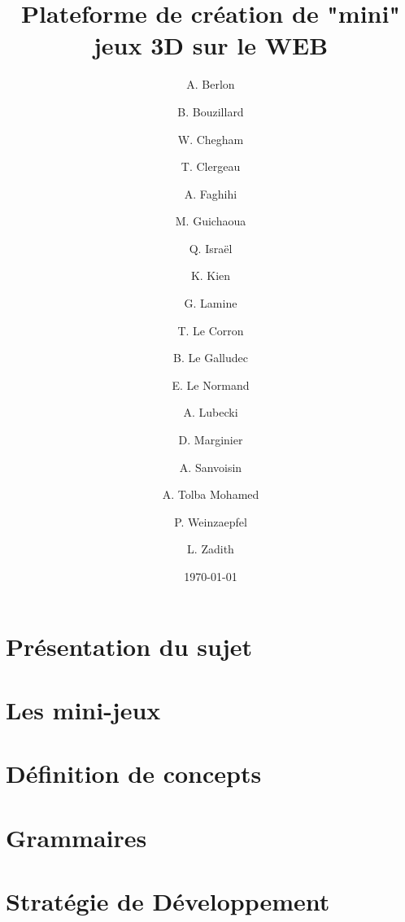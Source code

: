 \documentclass[a4paper,10pt]{article}
\title{Plateforme de création de "mini" jeux 3D sur le WEB}
\author{
A. Berlon \and
B. Bouzillard \and
W. Chegham \and
T. Clergeau \and
A. Faghihi \and
M. Guichaoua \and
Q. Israël \and
K. Kien \and
G. Lamine \and
T. Le Corron \and
B. Le Galludec \and
E. Le Normand \and
A. Lubecki \and
D. Marginier \and
A. Sanvoisin \and
A. Tolba Mohamed \and
P. Weinzaepfel \and
L. Zadith}
\date{\today}
\begin{document}
 
\maketitle

\section{Présentation du sujet}
\label{sec:sujet}
 

\section{Les mini-jeux}
\label{sec:minijeux}


\section{Définition de concepts}
\label{sec:concept}


\section{Grammaires}
\label{sec:grammaire}


\section{Stratégie de Développement}
\label{sec:strategie}


\appendix
\end{document}
